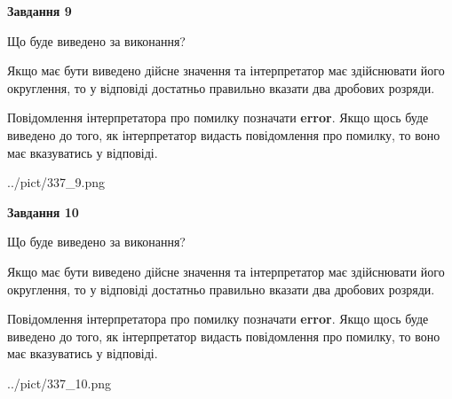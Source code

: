 \documentclass[12pt, ukrainian]{article}
\begin{document}
{\begin {Large}
{\begin {center}\textbf{Завдання 9}\end {center}}\par
Що буде виведено за виконання? \par

Якщо має бути виведено дійсне значення та інтерпретатор має здійснювати його округлення, 
то у відповіді достатньо правильно вказати два дробових розряди.

Повідомлення інтерпретатора про помилку позначати \textbf{error}.
Якщо щось буде виведено до того, як інтерпретатор видасть повідомлення про помилку, 
то воно має вказуватись у відповіді. \par

\begin{center}
	{../pict/337_9.png}
\end{center}
\newpage

{\begin {center}\textbf{Завдання 10}\end {center}}\par
Що буде виведено за виконання? \par

Якщо має бути виведено дійсне значення та інтерпретатор має здійснювати його округлення, 
то у відповіді достатньо правильно вказати два дробових розряди.

Повідомлення інтерпретатора про помилку позначати \textbf{error}.
Якщо щось буде виведено до того, як інтерпретатор видасть повідомлення про помилку, 
то воно має вказуватись у відповіді. \par

\begin{center}
	{../pict/337_10.png}
\end{center}
\newpage

\end {Large}}
\end{document}
